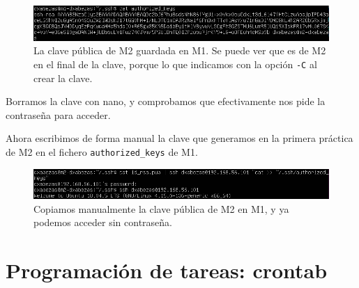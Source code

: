 \documentclass{article}
\begin{document}
\begin{figure}[H]
	\centering
	\includegraphics[width=140mm]{imgs/authorized-keys}
	\caption{La clave pública de M2 guardada en M1. Se puede ver que es de M2 en el final de la clave, porque lo que indicamos con la opción
		 \texttt{-C} al crear la clave.}
	\label{fig:authorized-keys}
\end{figure}

Borramos la clave con nano, y comprobamos que efectivamente nos pide la contraseña para acceder.

Ahora escribimos de forma manual la clave que generamos en la primera práctica de M2 en el fichero \texttt{authorized\_keys} de M1.

\begin{figure}[H]
	\centering
	\includegraphics[width=140mm]{imgs/ssh-manual}
	\caption{Copiamos manualmente la clave pública de M2 en M1, y ya podemos acceder sin contraseña.}
	\label{fig:ssh-manual}
\end{figure}

\section{Programación de tareas: crontab}
\end{document}
